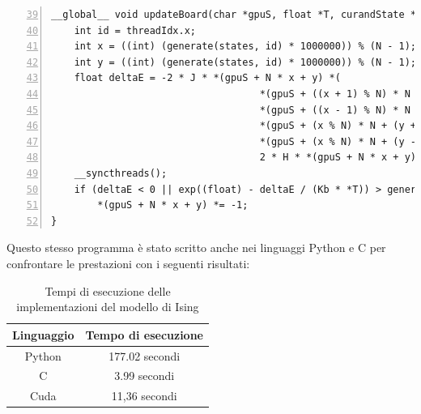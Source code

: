 \documentclass[a4paper,11pt]{article}
\begin{document}
\begin{Verbatim}[numbers=left, frame=single, firstnumber=39]
__global__ void updateBoard(char *gpuS, float *T, curandState *states) {
    int id = threadIdx.x;
    int x = ((int) (generate(states, id) * 1000000)) % (N - 1);
    int y = ((int) (generate(states, id) * 1000000)) % (N - 1);
    float deltaE = -2 * J * *(gpuS + N * x + y) *( 
                                    *(gpuS + ((x + 1) % N) * N + y % N) +
                                    *(gpuS + ((x - 1) % N) * N + y % N) +
                                    *(gpuS + (x % N) * N + (y + 1) % N) +
                                    *(gpuS + (x % N) * N + (y - 1) % N)) -
                                    2 * H * *(gpuS + N * x + y);
    __syncthreads();
    if (deltaE < 0 || exp((float) - deltaE / (Kb * *T)) > generate(states, id))
        *(gpuS + N * x + y) *= -1;
}
\end{Verbatim}

Questo stesso programma è stato scritto anche nei linguaggi Python e C per confrontare le prestazioni con i seguenti risultati:

\begin{table}[!ht]  
  \centering
    \begin{tabular}{c| c }
     Linguaggio & Tempo di esecuzione \\ \midrule
        Python      & 177.02 secondi      \\
        C           & 3.99 secondi        \\
        Cuda        & 11,36 secondi       \\
    \end{tabular}
    \caption{Tempi di esecuzione delle implementazioni del modello di Ising}
    \label{tab:tempi_ising}
\end{table}
\end{document}
